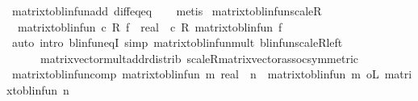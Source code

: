 \begin{isabellebody}
\ matrix{\isacharunderscore}{\kern0pt}to{\isacharunderscore}{\kern0pt}blinfun{\isacharunderscore}{\kern0pt}add\ diff{\isacharunderscore}{\kern0pt}eq{\isacharunderscore}{\kern0pt}eq\isanewline
\ \ \isamarkupfalse%
\ metis%
\endisatagproof
{\isafoldproof}%
%
\isadelimproof
\isanewline
%
\endisadelimproof
\isanewline
{}\isamarkupfalse%
\ matrix{\isacharunderscore}{\kern0pt}to{\isacharunderscore}{\kern0pt}blinfun{\isacharunderscore}{\kern0pt}scaleR{\isacharcolon}{\kern0pt}\ \isanewline
\ \ {\isachardoublequoteopen}matrix{\isacharunderscore}{\kern0pt}to{\isacharunderscore}{\kern0pt}blinfun\ {\isacharparenleft}{\kern0pt}c\ {\isacharasterisk}{\kern0pt}\isactrlsub R\ {\isacharparenleft}{\kern0pt}f\ {\isacharcolon}{\kern0pt}{\isacharcolon}{\kern0pt}\ real{\isacharcircum}{\kern0pt}{\isacharunderscore}{\kern0pt}{\isacharcircum}{\kern0pt}{\isacharunderscore}{\kern0pt}{\isacharparenright}{\kern0pt}{\isacharparenright}{\kern0pt}\ {\isacharequal}{\kern0pt}\ c\ {\isacharasterisk}{\kern0pt}\isactrlsub R\ matrix{\isacharunderscore}{\kern0pt}to{\isacharunderscore}{\kern0pt}blinfun\ f{\isachardoublequoteclose}\isanewline
%
\isadelimproof
\ \ %
\endisadelimproof
%
\isatagproof
{}\isamarkupfalse%
\ {\isacharparenleft}{\kern0pt}auto\ intro{\isacharbang}{\kern0pt}{\isacharcolon}{\kern0pt}\ blinfun{\isacharunderscore}{\kern0pt}eqI\ simp{\isacharcolon}{\kern0pt}\ matrix{\isacharunderscore}{\kern0pt}to{\isacharunderscore}{\kern0pt}blinfun{\isacharunderscore}{\kern0pt}mult\ blinfun{\isachardot}{\kern0pt}scaleR{\isacharunderscore}{\kern0pt}left\ \isanewline
\ \ \ \ \ \ matrix{\isacharunderscore}{\kern0pt}vector{\isacharunderscore}{\kern0pt}mult{\isacharunderscore}{\kern0pt}add{\isacharunderscore}{\kern0pt}rdistrib\ scaleR{\isacharunderscore}{\kern0pt}matrix{\isacharunderscore}{\kern0pt}vector{\isacharunderscore}{\kern0pt}assoc{\isacharbrackleft}{\kern0pt}symmetric{\isacharbrackright}{\kern0pt}{\isacharparenright}{\kern0pt}%
\endisatagproof
{\isafoldproof}%
%
\isadelimproof
\isanewline
%
\endisadelimproof
\isanewline
{}\isamarkupfalse%
\ matrix{\isacharunderscore}{\kern0pt}to{\isacharunderscore}{\kern0pt}blinfun{\isacharunderscore}{\kern0pt}comp{\isacharcolon}{\kern0pt}\ {\isachardoublequoteopen}matrix{\isacharunderscore}{\kern0pt}to{\isacharunderscore}{\kern0pt}blinfun\ {\isacharparenleft}{\kern0pt}{\isacharparenleft}{\kern0pt}m{\isacharcolon}{\kern0pt}{\isacharcolon}{\kern0pt}\ real{\isacharcircum}{\kern0pt}{\isacharunderscore}{\kern0pt}{\isacharcircum}{\kern0pt}{\isacharunderscore}{\kern0pt}{\isacharparenright}{\kern0pt}\ {\isacharasterisk}{\kern0pt}{\isacharasterisk}{\kern0pt}\ n{\isacharparenright}{\kern0pt}\ {\isacharequal}{\kern0pt}\ {\isacharparenleft}{\kern0pt}matrix{\isacharunderscore}{\kern0pt}to{\isacharunderscore}{\kern0pt}blinfun\ m{\isacharparenright}{\kern0pt}\ o\isactrlsub L\ {\isacharparenleft}{\kern0pt}matrix{\isacharunderscore}{\kern0pt}to{\isacharunderscore}{\kern0pt}blinfun\ n{\isacharparenright}{\kern0pt}{\isachardoublequoteclose}\isanewline

\end{isabellebody}
